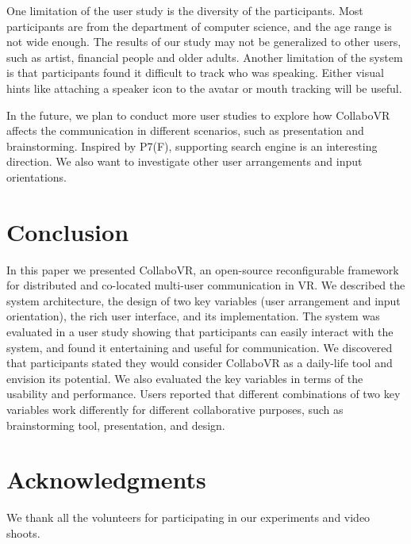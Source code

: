 \documentclass{sigchi}
\begin{document}
One limitation of the user study is the diversity of the participants. Most participants are from the department of computer science, and the age range is not wide enough. The results of our study may not be generalized to other users, such as artist, financial people and older adults. Another limitation of the system is that participants found it difficult to track who was speaking. Either visual hints like attaching a speaker icon to the avatar or mouth tracking will be useful.

In the future, we plan to conduct more user studies to explore how CollaboVR affects the communication in different scenarios, such as presentation and brainstorming. Inspired by P7(F), supporting search engine is an interesting direction. We also want to investigate other user arrangements and input orientations.

\section{Conclusion}
In this paper we presented CollaboVR, an open-source reconfigurable framework for distributed and co-located multi-user communication in VR. We described the system architecture, the design of two key variables (user arrangement and input orientation), the rich user interface, and its implementation. The system was evaluated in a user study showing that participants can easily interact with the system, and found it entertaining and useful for communication. We discovered that participants stated they would consider CollaboVR as a daily-life tool and envision its potential. We also evaluated the key variables in terms of the usability and performance. Users reported that different combinations of two key variables work differently for different collaborative purposes, such as brainstorming tool, presentation, and design.

\section{Acknowledgments}
We thank all the volunteers for participating in our experiments and video shoots.
\end{document}
